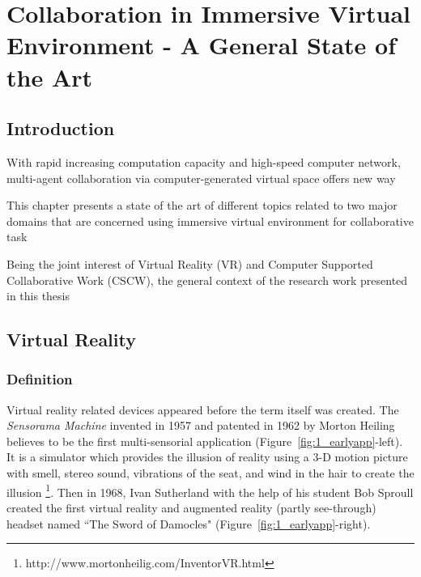 \chapter{Collaboration in Immersive Virtual Environment - A General State of the Art}
\label{chapter:context}
\minitoc

\section{Introduction}
With rapid increasing computation capacity and high-speed computer network, multi-agent collaboration via computer-generated virtual space offers new way 


This chapter presents a state of the art of different topics related to two major domains that are concerned using immersive virtual environment for collaborative task

Being the joint interest of Virtual Reality (VR) and Computer Supported Collaborative Work (CSCW), the general context of the research work presented in this thesis




\section{Virtual Reality}
\subsection{Definition}
Virtual reality related devices appeared before the term itself was created. The \textit{Sensorama Machine} invented in 1957 and patented in 1962 by Morton Heiling believes to be the first multi-sensorial application (Figure~\ref{fig:1_earlyapp}-left). It is a simulator which provides the illusion of reality using a 3-D motion picture with smell, stereo sound, vibrations of the seat, and wind in the hair to create the illusion \footnote{http://www.mortonheilig.com/InventorVR.html}. Then in 1968, Ivan Sutherland with the help of his student Bob Sproull created the first virtual reality and augmented reality (partly see-through) headset named ``The Sword of Damocles" \citep{Sutherland1968Hmd} (Figure~\ref{fig:1_earlyapp}-right).


